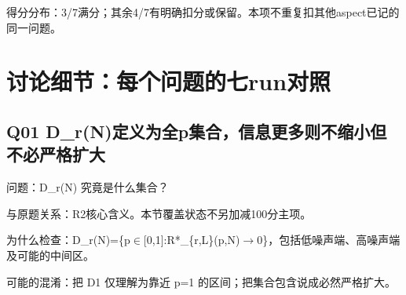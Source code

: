 \documentclass[11pt,a4paper]{article}
\begin{document}
得分分布：3/7满分；其余4/7有明确扣分或保留。本项不重复扣其他aspect已记的同一问题。

\clearpage
\section{讨论细节：每个问题的七run对照}
\subsection{Q01 D\_r(N)定义为全p集合，信息更多则不缩小但不必严格扩大}
\label{aspect:Q01}
问题：D\_r(N) 究竟是什么集合？

与原题关系：R2核心含义。本节覆盖状态不另加减100分主项。

为什么检查：D\_r(N)=\{p\ensuremath{\in}[0,1]:R*\_\{r,L\}(p,N)\ensuremath{\rightarrow}0\}，包括低噪声端、高噪声端及可能的中间区。

可能的混淆：把 D1 仅理解为靠近 p=1 的区间；把集合包含说成必然严格扩大。
\end{document}
